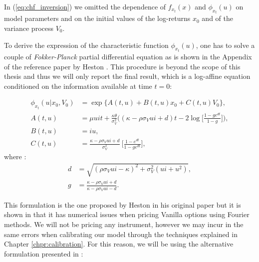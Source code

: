 In (\ref{eq:chf_inversion}) we omitted the dependence of $f_{x_t}(x)$ and $\phi_{x_t}(u)$ on model parameters and on the initial values of the log-returns $x_0$ and of the variance process $V_0$. 

\bigskip

To derive the expression of the characteristic function $\phi_{x_t}(u)$, one has to solve a couple of \textit{Fokker-Planck} partial differential equation as is shown in the Appendix of the reference paper by Heston \citep{HESTON93}. This procedure is beyond the scope of this thesis and thus we will only report the final result, which is a log-affine equation conditioned on the information available at time $t = 0$:

\begin{subequations}
	
\begin{align}
\label{eq:heston_chf+ABC}
	\phi_{x_t}(u| x_0, V_0) &= \exp\{A(t,u) + B(t,u) x_0 + C(t,u) V_0\}\nonumber, \\
	A(t,u) &= \mu u i t +  \frac{\kappa\theta}{\sigma_V^2} \bigg( (\kappa - \rho\sigma_V u i +d)t - 2 \log\Big[  \frac{1-ge^{dt}}{1-g} \Big] \bigg),\\
	B(t,u) &= i u, \\
	C(t,u)&= \frac{\kappa - \rho\sigma_V u i +d}{\sigma_V^2} \:\Big[\frac{1-e^{dt}}{1-ge^{dt}}\Big],
\end{align}
\end{subequations} 
where :
\begin{equation*}
\begin{split}
d&=\sqrt{(\rho \sigma_V u i - \kappa)^2 + \sigma_V^2(u i + u^2)},\\
g&= \frac{\kappa - \rho\sigma_V u i + d}{\kappa - \rho\sigma_V u i - d}.
\end{split}
\end{equation*} 



This formulation is the one proposed by Heston in his original paper \citep{HESTON93} but it is shown in \citep{HESTONTRAP}  that it has numerical issues when  pricing Vanilla options using Fourier methods. We will not be pricing any instrument, however we may incur in the same errors when calibrating our model through the techniques explained in Chapter \ref{chpr:calibration}. For this reason, we will be using the alternative formulation presented in \citep{HESTONTRAP}:




